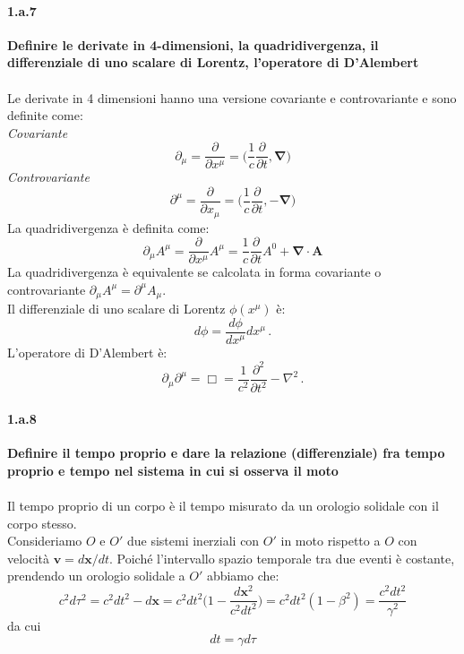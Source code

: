 \documentclass[twoside]{article}
\begin{document}
\paragraph{1.a.7}\textbf{Definire le derivate in 4-dimensioni, la quadridivergenza, il differenziale di uno
scalare di Lorentz, l’operatore di D’Alembert}\\
\\
Le derivate in 4 dimensioni hanno una versione covariante e controvariante e sono definite come:\\
\textit{Covariante}
\begin{equation*}
    \partial_{\mu}=\frac{\partial}{\partial x^{\mu}}=\biggl(\frac{1}{c}\frac{\partial}{\partial t}, \mathbf{\nabla}\biggr)
\end{equation*}
\textit{Controvariante}
\begin{equation*}
    \partial^{\mu}=\frac{\partial}{\partial x_{\mu}}=\biggl(\frac{1}{c}\frac{\partial}{\partial t}, -\mathbf{\nabla}\biggr)
\end{equation*}
La quadridivergenza è definita come:
\begin{equation*}
    \partial_{\mu}A^{\mu}=\frac{\partial}{\partial x^{\mu}}A^{\mu}=\frac{1}{c} \frac{\partial}{\partial t}A^{0}+ \mathbf{\nabla} \cdot \mathbf{A}
\end{equation*}
La quadridivergenza è equivalente se calcolata in forma covariante o controvariante $\partial_{\mu}A^{\mu}=\partial^{\mu}A_{\mu}$.\\
Il differenziale di uno scalare di Lorentz $\phi(x^\mu)$ è:
\begin{equation}
d\phi=\frac{d\phi}{dx^{\mu}} dx^{\mu} \, .
\end{equation}
L'operatore di D'Alembert è:
\begin{equation}
\partial_{\mu} \partial^{\mu}= \Box = \frac{1}{c^{2}} \frac{\partial^2}{\partial t^{2}} - \textbf{$\nabla$} ^{2} \, .
\end{equation}
\paragraph{1.a.8} \textbf{Definire il tempo proprio e dare la relazione (differenziale) fra tempo proprio e tempo nel sistema in cui si osserva il moto}\\
\\
Il tempo proprio di un corpo è il tempo misurato da un orologio solidale con il corpo stesso.\\
Consideriamo $O$ e $O'$ due sistemi inerziali con $O'$ in moto rispetto a $O$ con velocità $\mathbf{v}=d\mathbf{x}/dt$. Poiché l'intervallo spazio temporale tra due eventi è costante, prendendo un orologio solidale a $O'$ abbiamo che:
\begin{equation*}
    c^2d\tau^2=c^2dt^2-d\mathbf{x}=c^2dt^2\biggl(1-\frac{d\mathbf{x}^2}{c^2dt^2}\biggr)=c^2dt^2(1-\beta^2)=\frac{c^2dt^2}{\gamma^2}
\end{equation*}
da cui 
\begin{equation*}
    dt=\gamma d\tau
\end{equation*}
\end{document}
